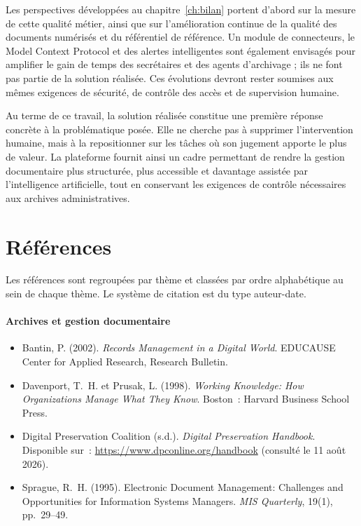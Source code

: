 \documentclass[12pt,a4paper]{report}
\begin{document}
Les perspectives développées au chapitre~\ref{ch:bilan} portent d'abord sur la mesure de cette qualité métier, ainsi que sur l'amélioration continue de la qualité des documents numérisés et du référentiel de référence. Un module de connecteurs, le Model Context Protocol et des alertes intelligentes sont également envisagés pour amplifier le gain de temps des secrétaires et des agents d'archivage ; ils ne font pas partie de la solution réalisée. Ces évolutions devront rester soumises aux mêmes exigences de sécurité, de contrôle des accès et de supervision humaine.

Au terme de ce travail, la solution réalisée constitue une première réponse concrète à la problématique posée. Elle ne cherche pas à supprimer l'intervention humaine, mais à la repositionner sur les tâches où son jugement apporte le plus de valeur. La plateforme fournit ainsi un cadre permettant de rendre la gestion documentaire plus structurée, plus accessible et davantage assistée par l'intelligence artificielle, tout en conservant les exigences de contrôle nécessaires aux archives administratives.

\chapter*{Références}

Les références sont regroupées par thème et classées par ordre alphabétique au sein de chaque thème. Le système de citation est du type auteur-date.

\subsubsection*{Archives et gestion documentaire}
\begin{itemize}[leftmargin=1.5em, itemsep=0.6em, label={}]
  \item\label{ref:bantin2002} Bantin, P. (2002). \textit{Records Management in a Digital World}. EDUCAUSE Center for Applied Research, Research Bulletin.

  \item\label{ref:davenport1998} Davenport, T.~H. et Prusak, L. (1998). \textit{Working Knowledge: How Organizations Manage What They Know}. Boston~: Harvard Business School Press.

  \item\label{ref:dpc} Digital Preservation Coalition (s.d.). \textit{Digital Preservation Handbook}. Disponible sur~: \url{https://www.dpconline.org/handbook} (consulté le 11 août 2026).

  \item\label{ref:sprague1995} Sprague, R.~H. (1995). Electronic Document Management: Challenges and Opportunities for Information Systems Managers. \textit{MIS Quarterly}, 19(1), pp.~29--49.
\end{itemize}
\end{document}
